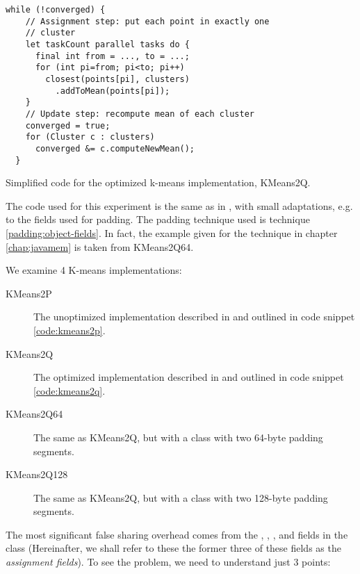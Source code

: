 \begin{code}
\begin{Verbatim}[frame=single]
  while (!converged) {
    // Assignment step: put each point in exactly one
    // cluster
    let taskCount parallel tasks do {
      final int from = ..., to = ...;
      for (int pi=from; pi<to; pi++)
        closest(points[pi], clusters)
          .addToMean(points[pi]);
    }
    // Update step: recompute mean of each cluster
    converged = true;
    for (Cluster c : clusters)
      converged &= c.computeNewMean();
  }

\end{Verbatim}
	\caption{Simplified code for the optimized k-means implementation, KMeans2Q.}
	\label{code:kmeans2q}
\end{code}

The code used for this experiment is the same as in \cite{mystery}, with small
adaptations, e.g. to the fields used for padding. The padding technique used is
technique \ref{padding:object-fields}. In fact, the example given for the
technique in chapter \ref{chap:javamem} is taken from KMeans2Q64.

We examine 4 K-means implementations:

\begin{description}
	\item[KMeans2P] {The unoptimized implementation described
		in\cite{mystery} and outlined in code snippet
		\ref{code:kmeans2p}.}
	\item[KMeans2Q] {The optimized implementation described in \cite{mystery}
		and outlined in  code snippet \ref{code:kmeans2q}.}
	\item[KMeans2Q64] {The same as KMeans2Q, but with a  class
		with two 64-byte padding segments.}
	\item[KMeans2Q128] {The same as KMeans2Q, but with a  class
		with two 128-byte padding segments.}
\end{description}

The most significant false sharing overhead comes from the ,
, , and  fields in the 
class (Hereinafter, we shall refer to these the former three of these fields as
the \textit{assignment fields}). To see the problem, we need to understand just
3 points:

